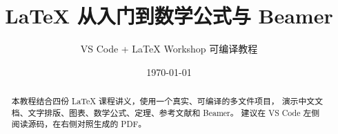\documentclass[UTF8,12pt,a4paper,fontset=fandol]{ctexart}
\title{LaTeX 从入门到数学公式与 Beamer}
\author{VS Code + LaTeX Workshop 可编译教程}
\date{\today}
\theoremstyle{plain}
\theoremstyle{definition}
\begin{document}
\pagestyle{plain}
\maketitle

\begin{abstract}
本教程结合四份 LaTeX 课程讲义，使用一个真实、可编译的多文件项目，
演示中文文档、文字排版、图表、数学公式、定理、参考文献和 Beamer。
建议在 VS Code 左侧阅读源码，在右侧对照生成的 PDF。
\end{abstract}

\tableofcontents
\clearpage



\clearpage


\clearpage


\clearpage


\clearpage


\clearpage


\clearpage


\clearpage


\clearpage
\printbibliography[title={参考文献}]
\end{document}
